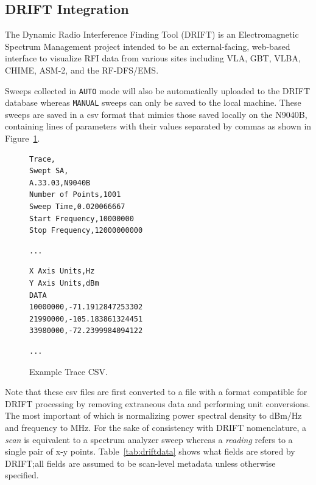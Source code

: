 \documentclass[titlepage]{article}
\begin{document}
\subsection{DRIFT Integration}\label{sec:drift}
The Dynamic Radio Interference Finding Tool (DRIFT) is an Electromagnetic Spectrum Management project intended to be an external-facing, web-based interface to visualize RFI data from various sites including VLA, GBT, VLBA, CHIME, ASM-2, and the RF-DFS/EMS.\@

Sweeps collected in \verb|AUTO| mode will also be automatically uploaded to the DRIFT database whereas \verb|MANUAL| sweeps can only be saved to the local machine. These sweeps are saved in a csv format that mimics those saved locally on the N9040B, containing lines of parameters with their values separated by commas as shown in Figure~\ref{fig:csvexample}.

\begin{figure}[ht]
\begin{lstlisting}[aboveskip=0pt, belowskip=0pt]
Trace,
Swept SA,
A.33.03,N9040B
Number of Points,1001
Sweep Time,0.020066667
Start Frequency,10000000
Stop Frequency,12000000000
\end{lstlisting}
\begin{lstlisting}[aboveskip=0pt, belowskip=0pt, numbers=none]
...
\end{lstlisting}
\begin{lstlisting}[aboveskip=0pt, belowskip=0pt, firstnumber=43]
X Axis Units,Hz
Y Axis Units,dBm
DATA
10000000,-71.1912847253302
21990000,-105.183861324451
33980000,-72.2399984094122
\end{lstlisting}
\begin{lstlisting}[aboveskip=0pt, belowskip=0pt, numbers=none]
...
\end{lstlisting}
\caption{Example Trace CSV.}\label{fig:csvexample}
\end{figure}

Note that these csv files are first converted to a file with a format compatible for DRIFT processing by removing extraneous data and performing unit conversions. The most important of which is normalizing power spectral density to dBm/Hz and frequency to MHz. For the sake of consistency with DRIFT nomenclature, a \textit{scan} is equivalent to a spectrum analyzer sweep whereas a \textit{reading} refers to a single pair of x-y points. Table~\ref{tab:driftdata} shows what fields are stored by DRIFT;\@ all fields are assumed to be scan-level metadata unless otherwise specified.
\end{document}
